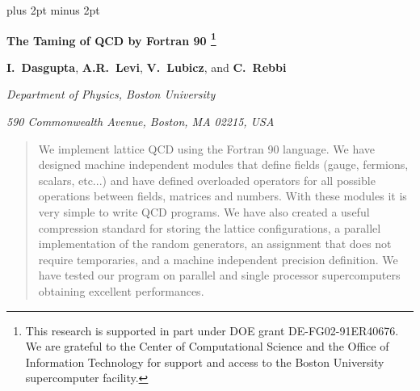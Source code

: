 %
%
%
%
%




\begin{titlepage}

\baselineskip 24pt plus 2pt minus 2pt

\vspace*{1.0cm}

\begin{center}
{\Large \bf The Taming of QCD by Fortran 90 \footnote{
               This research is supported in part under DOE grant
               DE-FG02-91ER40676.
               We are grateful to the Center of Computational Science 
               and the Office of Information Technology for support 
               and access to the Boston University supercomputer 
               facility. }}
\end{center}

\vspace*{0.8cm}
\centerline{ {\bf I.~Dasgupta}, {\bf A.R.~Levi}, 
             {\bf V.~Lubicz}, and {\bf C.~Rebbi} }
\centerline{\it Department of Physics, Boston University}
\centerline{\it 590 Commonwealth Avenue, Boston, MA 02215, USA}



\vspace*{1.5cm}

\begin{abstract}
We implement lattice QCD using the Fortran 90 language. 
We have designed machine independent modules
that define fields (gauge, fermions, scalars, etc...)
and have defined overloaded operators for all possible operations 
between fields, matrices and numbers. 
With these modules it is very simple to write QCD programs. 
We have also created a useful compression standard for 
storing the lattice configurations, 
a parallel implementation of the random generators,
an assignment that does not require temporaries, 
and a machine independent precision definition. 
We have tested our program on parallel and single
processor supercomputers obtaining excellent performances.
\end{abstract}

\vfill
\end{titlepage}




